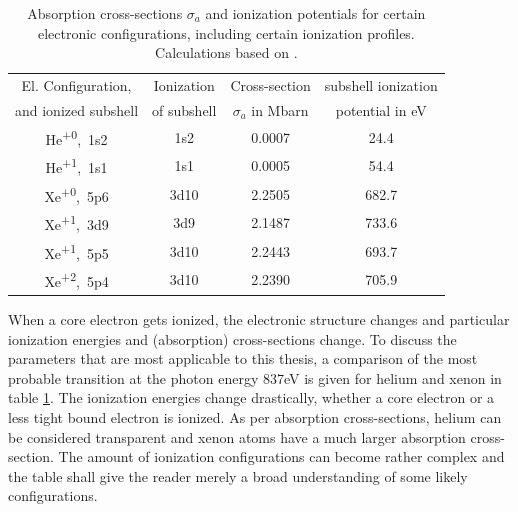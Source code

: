 \begin{table}
	\centering
		\begin{tabular}{ | c | c | c | c | }
		\hline
			El. Configuration, & Ionization & Cross-section  & subshell ionization  \\
			and ionized subshell & of subshell & $\sigma_{a}$ in Mbarn & potential in eV \\ \hline
			He\textsuperscript{+0},\ 1s2 & 1s2 & 0.0007 & 24.4 \\ \hline
			He\textsuperscript{+1},\ 1s1 & 1s1 & 0.0005 & 54.4 \\ \hline
			Xe\textsuperscript{+0},\ 5p6 & 3d10 & 2.2505 & 682.7 \\ \hline
			Xe\textsuperscript{+1},\ 3d9 & 3d9 & 2.1487 & 733.6 \\ \hline
			Xe\textsuperscript{+1},\ 5p5 & 3d10 & 2.2443 & 693.7 \\ \hline
			Xe\textsuperscript{+2},\ 5p4 & 3d10 & 2.2390 & 705.9 \\ \hline
		\end{tabular}
	\caption[Absorption cross-sections and ionization potentials for xenon and helium]{Absorption cross-sections $\sigma_{a}$ and ionization potentials for certain electronic configurations, including certain ionization profiles. Calculations based on \citep{Cowan-1981-Cal}.}
	\label{tab:helium-xenon-ionization}
\end{table}
When a core electron gets ionized, the electronic structure changes and particular ionization energies and (absorption) cross-sections change. To discuss the parameters that are most applicable to this thesis, a comparison of the most probable transition at the photon energy 837eV is given for helium and xenon in table \ref{tab:helium-xenon-ionization}. The ionization energies change drastically, whether a core electron or a less tight bound electron is ionized. As per absorption cross-sections, helium can be considered transparent and xenon atoms have a much larger absorption cross-section. The amount of ionization configurations can become rather complex and the table shall give the reader merely a broad understanding of some likely configurations.\\
